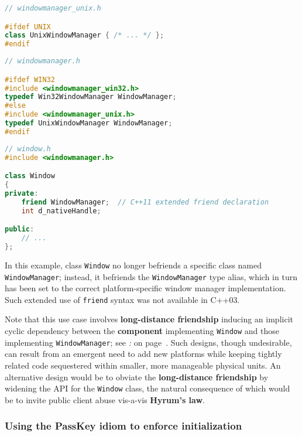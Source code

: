 \begin{lstlisting}[language=C++]
// windowmanager_unix.h

#ifdef UNIX
class UnixWindowManager { /* ... */ };
#endif
\end{lstlisting}

\vspace*{2ex}

\begin{lstlisting}[language=C++]
// windowmanager.h

#ifdef WIN32
#include <windowmanager_win32.h>
typedef Win32WindowManager WindowManager;
#else
#include <windowmanager_unix.h>
typedef UnixWindowManager WindowManager;
#endif
\end{lstlisting}

\vspace*{2ex}

\begin{lstlisting}[language=C++]
// window.h
#include <windowmanager.h>

class Window
{
private:
    friend WindowManager;  // C++11 extended friend declaration
    int d_nativeHandle;

public:
    // ...
};
\end{lstlisting}


In this example, class \texttt{Window} no longer befriends a specific
class named \texttt{WindowManager}; instead, it befriends the
\texttt{WindowManager} type alias, which in turn has been set to the
correct platform-specific window manager implementation. Such extended
use of \texttt{friend} syntax was not available in C++03.

Note that this use case involves \textbf{long-distance friendship}
inducing an implicit cyclic dependency between the \textbf{component}
implementing \texttt{Window} and those implementing
\texttt{WindowManager}; see \textit{: } on page~\pageref{long-distance-friendship}. Such designs, though
undesirable, can result from an emergent need to add new platforms while
keeping tightly related code sequestered within smaller, more manageable
physical units. An alternative design would be to obviate the
\textbf{long-distance friendship} by widening the API for the
\texttt{Window} class, the natural consequence of which would be to
invite public client abuse vis-a-vis \textbf{Hyrum's law}.

\subsubsection[Using the {\tt PassKey} idiom to enforce initialization]{Using the {\SubsubsecCode PassKey} idiom to enforce initialization}\label{using-the-passkey-idiom-to-enforce-initialization}

